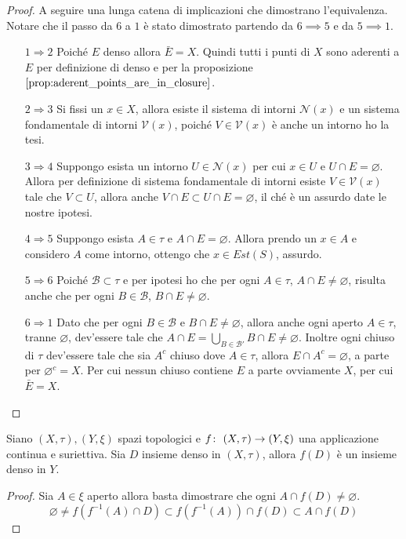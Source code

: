 \begin{proof}
	A seguire una lunga catena di implicazioni che dimostrano l'equivalenza. Notare che il passo da $6$ a $1$ è stato dimostrato partendo da $6 \implies 5$ e da $5 \implies 1$.
	\begin{enumerate}
		\item[$1 \Rightarrow 2$] Poiché $E$ denso allora $\bar{E} = X$. Quindi tutti i punti di $X$ sono aderenti a $E$ per definizione di denso e per la proposizione $\ref{prop:aderent_points_are_in_closure}$.
		\item[$2 \Rightarrow 3$] Si fissi un $x \in X$, allora esiste il sistema di intorni $\mathcal{N}(x)$ e un sistema fondamentale di intorni $\mathcal{V}(x)$, poiché $V \in \mathcal{V}(x)$ è anche un intorno ho la tesi.
		\item[$3 \Rightarrow 4$] Suppongo esista un intorno $U \in \mathcal{N}(x)$ per cui $x \in U$ e $U \cap E = \varnothing$. Allora per definizione di sistema fondamentale di intorni esiste $V \in \mathcal{V}(x)$ tale che $V \subset U$, allora anche $V \cap E \subset U \cap E = \varnothing$, il ché è un assurdo date le nostre ipotesi.  
		\item[$4 \Rightarrow 5$] Suppongo esista $A \in \tau$ e $A \cap E = \varnothing$. Allora prendo un $x \in A$ e considero $A$ come intorno, ottengo che $x \in Est(S)$, assurdo.  
		\item[$5 \Rightarrow 6$] Poiché $\mathcal{B} \subset \tau$ e per ipotesi ho che per ogni $A \in \tau$, $A \cap E \neq \varnothing$, risulta anche che per ogni $B \in \mathcal{B}$, $B \cap E \neq \varnothing$.
		\item[$6 \Rightarrow 1$] Dato che per ogni $B \in \mathcal{B}$ e $B \cap E \neq \varnothing$, allora anche ogni aperto $A \in \tau$, tranne $\varnothing$, dev'essere tale che $ A \cap E = \bigcup_{B \in \mathcal{B}'} B \cap E \neq \varnothing$. Inoltre ogni chiuso di $\tau$ dev'essere tale che sia $A^c$ chiuso dove $A \in \tau$, allora $E \cap A^c = \varnothing$, a parte per $\varnothing^c = X$. Per cui nessun chiuso contiene $E$ a parte ovviamente $X$, per cui $\bar{E} = X$.
	\end{enumerate}
\end{proof}

\begin{theorem}
	Siano $(X,\tau), (Y, \xi)$ spazi topologici e $f \colon\ (X,\tau) \rightarrow (Y,\xi)$ una applicazione continua e suriettiva. Sia $D$ insieme denso in $(X,\tau)$, allora $f(D)$ è un insieme denso in $Y$.
\end{theorem}
\begin{proof}
	Sia $A \in \xi$ aperto allora basta dimostrare che ogni $A \cap f(D) \neq \varnothing$. 
	\begin{equation*}
		\varnothing \neq f(f^{-1}(A) \cap D) \subset f(f^{-1}(A)) \cap f(D) \subset A \cap f(D) 
	\end{equation*}
\end{proof}



